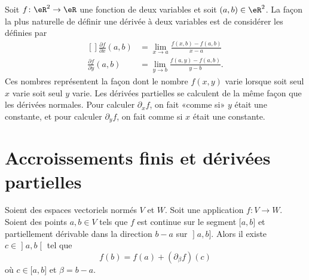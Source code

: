 Soit \( f\colon \eR^2\to \eR\) une fonction de deux variables et soit \( (a,b)\in\eR^2\). La façon la plus naturelle de définir une dérivée à deux variables est de considérer les  définies par
\begin{equation}
	\begin{aligned}[]
		\frac{ \partial f }{ \partial x }(a,b) & =\lim_{x\to a} \frac{ f(x,b)-f(a,b) }{ x-a } \\
		\frac{ \partial f }{ \partial y }(a,b) & =\lim_{y\to b} \frac{ f(a,y)-f(a,b) }{y-b}.
	\end{aligned}
\end{equation}
Ces nombres représentent la façon dont le nombre \( f(x,y)\) varie lorsque soit seul \( x\) varie soit seul \( y\) varie. Les dérivées partielles se calculent de la même façon que les dérivées normales. Pour calculer \( \partial_xf\), on fait «comme si» \( y\) était une constante, et pour calculer \( \partial_yf\), on fait comme si \( x\) était une constante.


\section{Accroissements finis et dérivées partielles}



\begin{proposition}     \label{PROPooCAWBooINcNxj}
	Soient des espaces vectoriels normés \( V\) et \( W\). Soit une application \( f\colon V\to W\). Soient des points \( a,b\in V\) tels que \( f\) est continue sur le segment \( \mathopen[ a , b \mathclose]\) et partiellement dérivable dans la direction \( b-a\) sur \( \mathopen] a , b \mathclose]\). Alors il existe \( c\in\mathopen] a , b \mathclose[\) tel que
	\begin{equation}
		f(b)=f(a)+(\partial_{\beta}f)(c)
	\end{equation}
	où \( c\in \mathopen[ a , b \mathclose]\) et \( \beta=b-a\).
\end{proposition}


